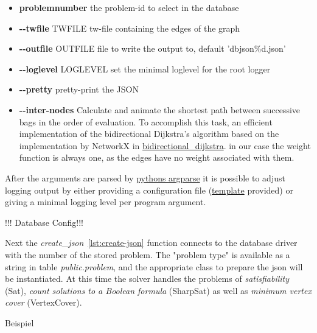 \documentclass[a4paper, 12pt, bibliography=totoc]{scrartcl}
\begin{document}
\begin{itemize}
	\item
	\textbf{problemnumber}
	 the problem-id to select in the database
	 
	\item
	\textbf{-{}-twfile }TWFILE
	tw-file containing the edges of the graph 
	
	\item
	\textbf{-{}-outfile }OUTFILE
	 file to write the output to, default 'dbjson\%d.json'
	 
	\item
	\textbf{-{}-loglevel }LOGLEVEL
	 set the minimal loglevel for the root logger
	 
	\item
	\textbf{-{}-pretty}
	 pretty-print the JSON
	 
	\item
	\textbf{-{}-inter-nodes}
	Calculate and animate the shortest path between successive bags in the order of evaluation. To accomplish this task, an efficient implementation of the bidirectional Dijkstra's algorithm \cite{shortestPathAlgo} based on the implementation by NetworkX \cite{SciPyProceedings_11} in \href{https://networkx.github.io/documentation/networkx-2.1/reference/algorithms/generated/networkx.algorithms.shortest_paths.weighted.bidirectional_dijkstra.html#networkx.algorithms.shortest_paths.weighted.bidirectional_dijkstra}{bidirectional\_dijkstra}.
	in our case the weight function is always one, as the edges have no weight associated with them.
\end{itemize}
After the arguments are parsed by \href{https://docs.python.org/3/library/argparse.html}{pythons argparse} it is possible to adjust logging output by either providing a configuration file (\href{https://github.com/VaeterchenFrost/tdvisu/blob/master/tdvisu/logging.yml}{template} provided) or giving a minimal logging level per program argument.

!!! Database Config!!!

Next the \textit{create\_json}~\ref{lst:create-json} function connects to the database driver with 
the number of the stored problem. 
The "problem type" is available as a string in table \emph{public.problem}, and the appropriate class to prepare the json will be instantiated. At this time the solver handles the problems of \textit{satisfiability} (Sat), \textit{count solutions to a Boolean formula} (SharpSat) as well as \textit{minimum vertex cover} (VertexCover).


Beispiel
\end{document}
